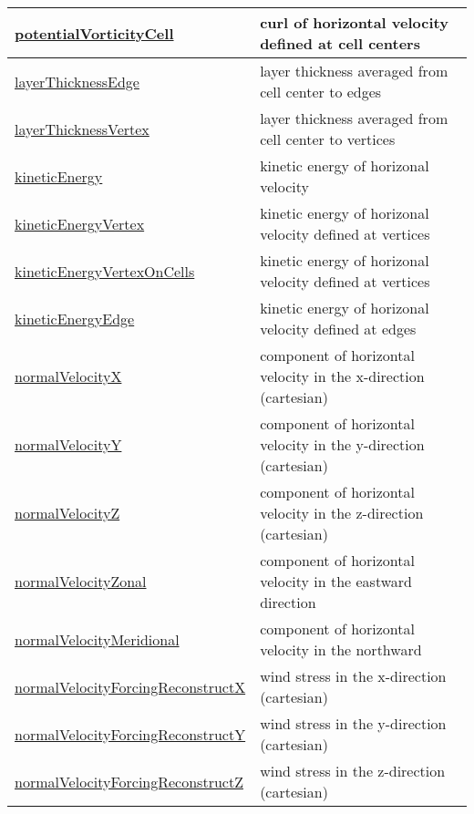 {\begin{center}
\begin{longtable}{| p{2.0in} | p{4.0in} |}
	\hline
	\hyperref[subsec:var_sec_state_potentialVorticityCell]{potentialVorticityCell} & curl of horizontal velocity defined at cell centers \\
	\hline
	\hyperref[subsec:var_sec_state_layerThicknessEdge]{layerThicknessEdge} & layer thickness averaged from cell center to edges \\
	\hline
	\hyperref[subsec:var_sec_state_layerThicknessVertex]{layerThicknessVertex} & layer thickness averaged from cell center to vertices \\
	\hline
	\hyperref[subsec:var_sec_state_kineticEnergy]{kineticEnergy} & kinetic energy of horizonal velocity \\
	\hline
	\hyperref[subsec:var_sec_state_kineticEnergyVertex]{kineticEnergyVertex} & kinetic energy of horizonal velocity defined at vertices \\
	\hline
	\hyperref[subsec:var_sec_state_kineticEnergyVertexOnCells]{kineticEnergyVertexOnCells} & kinetic energy of horizonal velocity defined at vertices \\
	\hline
	\hyperref[subsec:var_sec_state_kineticEnergyEdge]{kineticEnergyEdge} & kinetic energy of horizonal velocity defined at edges \\
	\hline
	\hyperref[subsec:var_sec_state_normalVelocityX]{normalVelocityX} & component of horizontal velocity in the x-direction (cartesian) \\
	\hline
	\hyperref[subsec:var_sec_state_normalVelocityY]{normalVelocityY} & component of horizontal velocity in the y-direction (cartesian) \\
	\hline
	\hyperref[subsec:var_sec_state_normalVelocityZ]{normalVelocityZ} & component of horizontal velocity in the z-direction (cartesian) \\
	\hline
	\hyperref[subsec:var_sec_state_normalVelocityZonal]{normalVelocityZonal} & component of horizontal velocity in the eastward direction \\
	\hline
	\hyperref[subsec:var_sec_state_normalVelocityMeridional]{normalVelocityMeridional} & component of horizontal velocity in the northward \\
	\hline
	\hyperref[subsec:var_sec_state_normalVelocityForcingReconstructX]{normalVelocityForcingReconstructX} & wind stress in the x-direction (cartesian) \\
	\hline
	\hyperref[subsec:var_sec_state_normalVelocityForcingReconstructY]{normalVelocityForcingReconstructY} & wind stress in the y-direction (cartesian) \\
	\hline
	\hyperref[subsec:var_sec_state_normalVelocityForcingReconstructZ]{normalVelocityForcingReconstructZ} & wind stress in the z-direction (cartesian) \\

\end{longtable}
\end{center}}
